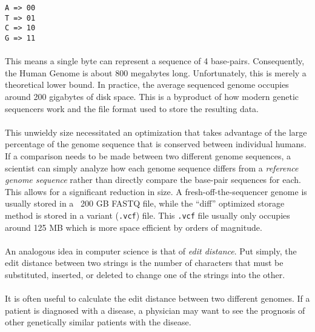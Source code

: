\begin{verbatim}
A => 00
T => 01
C => 10
G => 11
\end{verbatim}

\paragraph{}
This means a single byte can represent a sequence of 4 base-pairs. Consequently, the Human Genome is about 800 megabytes long. Unfortunately, this is merely a theoretical lower bound. In practice, the average sequenced genome occupies around 200 gigabytes of disk space. This is a byproduct of how modern genetic sequencers work and the file format used to store the resulting data.

\paragraph{}
This unwieldy size necessitated an optimization that takes advantage of the large percentage of the genome sequence that is conserved between individual humans. If a comparison needs to be made between two different genome sequences, a scientist can simply analyze how each genome sequence differs from a \textit{reference genome sequence} rather than directly compare the base-pair sequences for each. This allows for a significant reduction in size. A fresh-off-the-sequencer genome is usually stored in a ~200 GB FASTQ file, while the ``diff'' optimized storage method is stored in a variant (\texttt{.vcf}) file. This \texttt{.vcf} file usually only occupies around 125 MB which is more space efficient by orders of magnitude.

\paragraph{}
An analogous idea in computer science is that of \textit{edit distance}. Put simply, the edit distance between two strings is the number of characters that must be substituted, inserted, or deleted to change one of the strings into the other.

\paragraph{}
It is often useful to calculate the edit distance between two different genomes. If a patient is diagnosed with a disease, a physician may want to see the prognosis of other genetically similar patients with the disease.

